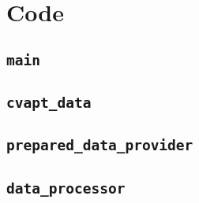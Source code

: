 \documentclass[10pt,journal,compsoc]{IEEEtran}
\begin{document}
\onecolumn
\section{Code}
\subsection*{\texttt{main}}

\subsection*{\texttt{cvapt\_data}}

\subsection*{\texttt{prepared\_data\_provider}}

\subsection*{\texttt{data\_processor}}






\ifCLASSOPTIONcaptionsoff
  \newpage
\fi



\end{document}
